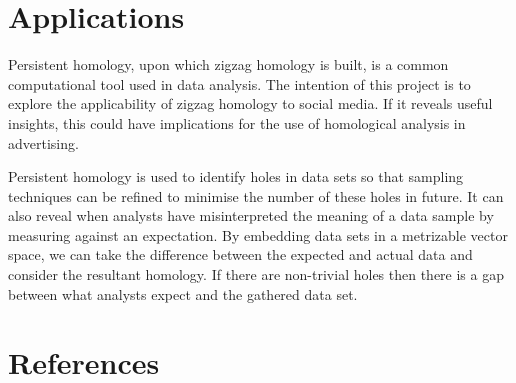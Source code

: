 \documentclass[12pt, a4paper]{article}
\begin{document}
\section*{Applications}
Persistent homology, upon which zigzag homology is built, is a common computational tool used in data analysis. The intention of this project is to explore the applicability of zigzag homology to social media. If it reveals useful insights, this could have implications for the use of homological analysis in advertising.

Persistent homology is used to identify holes in data sets so that sampling techniques can be refined to minimise the number of these holes in future. It can also reveal when analysts have misinterpreted the meaning of a data sample by measuring against an expectation. By embedding data sets in a metrizable vector space, we can take the difference between the expected and actual data and consider the resultant homology. If there are non-trivial holes then there is a gap between what analysts expect and the gathered data set.


\section*{References}

\begingroup
\renewcommand{\section}[2]{}
\nocite{*}

\endgroup
\end{document}
